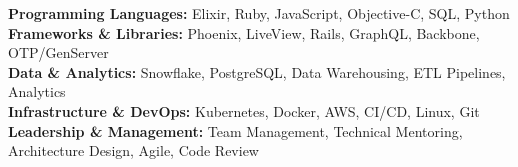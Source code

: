 \textbf{Programming Languages:} Elixir, Ruby, JavaScript, Objective-C, SQL, Python\\[0.2em]
\textbf{Frameworks \& Libraries:} Phoenix, LiveView, Rails, GraphQL, Backbone, OTP/GenServer\\[0.2em]
\textbf{Data \& Analytics:} Snowflake, PostgreSQL, Data Warehousing, ETL Pipelines, Analytics\\[0.2em]
\textbf{Infrastructure \& DevOps:} Kubernetes, Docker, AWS, CI/CD, Linux, Git\\[0.2em]
\textbf{Leadership \& Management:} Team Management, Technical Mentoring, Architecture Design, Agile, Code Review
